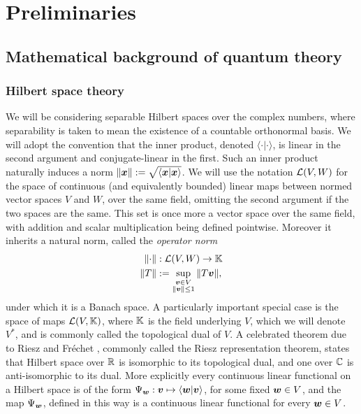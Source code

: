 \let\textcircled=\pgftextcircled
\chapter{Preliminaries}
\label{chap:prelim}


\bigskip

\section{Mathematical background of quantum theory}

\subsection{Hilbert space theory}

We will be considering separable Hilbert spaces over the complex numbers, where separability is taken to mean the existence of a countable orthonormal basis. We will adopt the convention that the inner product, denoted $\langle\cdot|\cdot\rangle$, is linear in the second argument and conjugate-linear in the first. Such an inner product naturally induces a norm ${\left\lVert{\bm{x}}\right\rVert} := \sqrt{\langle \bm{x}| \bm{x}\rangle}$. We will use the notation $\bops[V][W]$ for the space of continuous (and equivalently bounded) linear maps between normed vector spaces $V$ and $W$, over the same field, omitting the second argument if the two spaces are the same. This set is once more a vector space over the same field, with addition and scalar multiplication being defined pointwise. Moreover it inherits a natural norm, called the \emph{operator norm} 
\begin{align}
  \norm{\cdot}&:\bops[V][W]\to \K\\
  \norm{T} &\defeq \sup_{\substack{\bov\in V \\ \norm{\bov}\leq 1}}\norm{T\bov}, \label{eqn:operator-norm}
\end{align}
under which it is a Banach space. A particularly important special case is the space of maps $\bops[V][\K]$, where $\mathbb{K}$ is the field underlying $V$, which we will denote $V^*$, and is commonly called the topological dual of $V$. A celebrated theorem due to Riesz \cite{riesz-representation-riesz} and Fr{\'e}chet \cite{riesz-representation-frechet}, commonly called the Riesz representation theorem, states that Hilbert space over $\mathbb{R}$ is isomorphic to its topological dual, and one over $\mathbb{C}$ is anti-isomorphic to its dual. More explicitly every continuous linear functional on a Hilbert space is of the form $\Psi_{\bm{w}} :\bm{v}\mapsto \langle{\bm{w}} |\bm{v}\rangle$, for some fixed $\bm{w}\in V$, and the map $\Psi_{\bm{w}}$, defined in this way is a continuous linear functional for every $\bm{w}\in V$.


